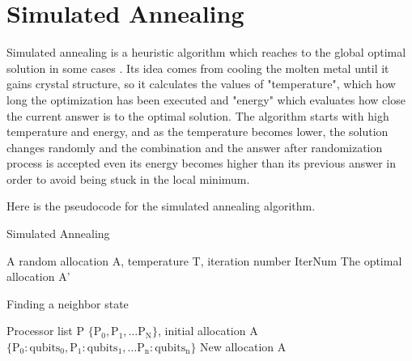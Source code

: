 \section{Simulated Annealing}
Simulated annealing is a heuristic algorithm which reaches to the global optimal solution in some cases \cite{simulatedannealing, Boltzmann}. Its idea comes from cooling the molten metal until it gains crystal structure, so it calculates the values of "temperature", which how long the optimization has been executed and "energy" which evaluates how close the current answer is to the optimal solution.  The algorithm starts with high temperature and energy, and as the temperature becomes lower,  the solution changes randomly and the combination and the answer after randomization process is accepted even its energy becomes higher than its previous answer in order to avoid being stuck in the local minimum.

Here is the pseudocode for the simulated annealing algorithm.

\begin{algorithm}
 \caption{Simulated Annealing}
  \begin{algorithmic}[1]
  \Require A random allocation A, temperature T, iteration number IterNum
  \Ensure The optimal allocation A'
    \EndIf
 \EndFor
\EndFunction
 \end{algorithmic}
 \end{algorithm}
 
 \begin{algorithm}
 \caption{Finding a neighbor state}
  \begin{algorithmic}[1]
\Require Processor list P $\{\operatorname{P_0}, \operatorname{P_1}, \dots \operatorname{P_N}\}$, initial allocation A  $\{\operatorname{P_0}:\operatorname{qubits_0}, \operatorname{P_1}:\operatorname{qubits_1}, \dots \operatorname{P_n}:\operatorname{qubits_n}\}$
 \Ensure New allocation A
  \EndFunction
   \end{algorithmic}
 \end{algorithm}
  
